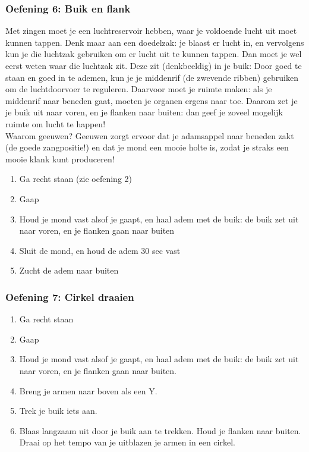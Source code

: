 \begin{enumerate}
\subsubsection*{Oefening 6: Buik en flank}
Met zingen moet je een luchtreservoir hebben, waar je voldoende lucht uit moet kunnen tappen. Denk maar aan een doedelzak: je blaast er lucht in, en vervolgens kun je die luchtzak gebruiken om er lucht uit te kunnen tappen. Dan moet je wel eerst weten waar die luchtzak zit. Deze zit (denkbeeldig) in je buik: Door goed te staan en goed in te ademen, kun je je middenrif (de zwevende ribben) gebruiken om de luchtdoorvoer te reguleren. Daarvoor moet je ruimte maken: als je middenrif naar beneden gaat, moeten je organen ergens naar toe. Daarom zet je je buik uit naar voren, en je flanken naar buiten: dan geef je zoveel mogelijk ruimte om lucht te happen!\\
Waarom geeuwen? Geeuwen zorgt ervoor dat je adamsappel naar beneden zakt (de goede zangpositie!) en dat je mond een mooie holte is, zodat je straks een mooie klank kunt produceren!
\begin{enumerate}
\item Ga recht staan (zie oefening 2)
\item Gaap
\item Houd je mond vast alsof je gaapt, en haal adem met de buik: de buik zet uit naar voren, en je flanken gaan naar buiten
\item Sluit de mond, en houd de adem 30 sec vast
\item Zucht de adem naar buiten 
\end{enumerate}
\subsubsection*{Oefening 7: Cirkel draaien}
\begin{enumerate}
\item Ga recht staan
\item Gaap
\item Houd je mond vast alsof je gaapt, en haal adem met de buik: de buik zet uit naar voren, en je flanken gaan naar buiten.
\item Breng je armen naar boven als een Y.
\item Trek je buik iets aan.
\item Blaas langzaam uit door je buik aan te trekken. Houd je flanken naar buiten. Draai op het tempo van je uitblazen je armen in een cirkel.
\end{enumerate}

\end{enumerate}
